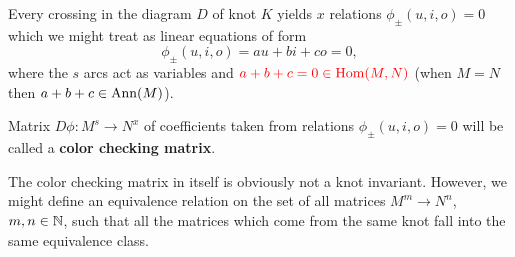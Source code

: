 Every crossing in the diagram $D$ of knot $K$ yields $x$ relations $\phi_\pm(u,i,o)=0$ which we might treat as linear equations of form 
$$\phi_\pm(u,i,o)=au+bi+co=0,$$
where the $s$ arcs act as variables and $\color{red}a+b+c=0\in \operatorname{Hom}(M, N)$ (when $M=N$ then $a+b+c\in\operatorname{Ann}(M)$).

\medskip

\begin{definition}
  Matrix $D\phi:M^s\to N^x$ of coefficients taken from relations $\phi_\pm(u,i,o)=0$ will be called a \textbf{color checking matrix}. 
\end{definition}

The color checking matrix in itself is obviously not a knot invariant. However, we might define an equivalence relation on the set of all matrices $M^m\to N^n$, $m,n\in\operatorname{\mathbb{N}}$, such that all the matrices which come from the same knot fall into the same equivalence class.


